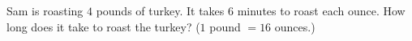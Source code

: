 Sam is roasting $4$ pounds of turkey. It takes $6$ minutes to roast each ounce. How long does it take to roast the turkey? ($1$ pound $=16$ ounces.)
